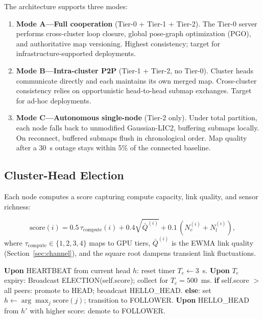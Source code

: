The architecture supports three modes:

\begin{enumerate}
  \item \textbf{Mode A---Full cooperation} (Tier-0 + Tier-1 + Tier-2). The
    Tier-0 server performs cross-cluster loop closure, global pose-graph
    optimization (PGO), and authoritative map versioning. Highest consistency;
    target for infrastructure-supported deployments.

  \item \textbf{Mode B---Intra-cluster P2P} (Tier-1 + Tier-2, no Tier-0).
    Cluster heads communicate directly and each maintains its own merged
    map. Cross-cluster consistency relies on opportunistic head-to-head
    submap exchanges. Target for ad-hoc deployments.

  \item \textbf{Mode C---Autonomous single-node} (Tier-2 only). Under total
    partition, each node falls back to unmodified Gaussian-LIC2, buffering
    submaps locally. On reconnect, buffered submaps flush in chronological
    order. Map quality after a 30~s outage stays within 5\% of the connected
    baseline.
\end{enumerate}

\subsection{Cluster-Head Election}

\label{sec:election}

Each node computes a score capturing compute capacity, link quality, and
sensor richness:

\begin{equation}
  \text{score}(i) = 0.5\,\tau_{\text{compute}}(i) + 0.4\sqrt{\bar{Q}^{(i)}} + 0.1\,(N_c^{(i)}+N_l^{(i)}),
  \label{eq:score}
\end{equation}
where $\tau_{\text{compute}}\in\{1,2,3,4\}$ maps to GPU tiers, $\bar{Q}^{(i)}$
is the EWMA link quality (Section~\ref{sec:channel}), and the square root
dampens transient link fluctuations.

\begin{algorithm}[t]
\caption{Cluster-head election (per node).}
\label{alg:election}
\begin{algorithmic}[1]
\State \textbf{Upon} HEARTBEAT from current head $h$: reset timer $T_e\gets 3$~s.
\State \textbf{Upon} $T_e$ expiry:
\State \quad Broadcast ELECTION(self.score); collect for $T_c=500$~ms.
\State \quad \textbf{if} self.score $>$ all peers: promote to HEAD; broadcast HELLO\_HEAD.
\State \quad \textbf{else}: set $h\gets\arg\max_j\text{score}(j)$; transition to FOLLOWER.
\State \textbf{Upon} HELLO\_HEAD from $h'$ with higher score: demote to FOLLOWER.
\end{algorithmic}
\end{algorithm}

